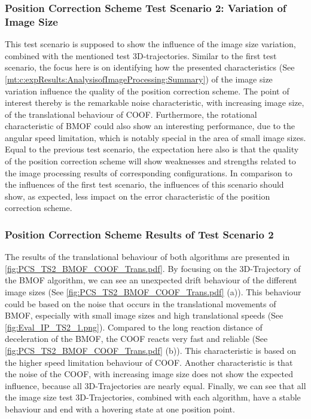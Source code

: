 \subsubsection{Position Correction Scheme Test Scenario 2: Variation of Image Size}
This test scenario is supposed to show the influence of the image size variation, combined with the mentioned test 3D-trajectories. Similar to the first test scenario, the focus here is on identifying how the presented characteristics (See \ref{mt:c:expResults:AnalysisofImageProcessing:Summary}) of the image size variation influence the quality of the position correction scheme. The point of interest thereby is the remarkable noise characteristic, with increasing image size, of the translational behaviour of \gls{COOF}. Furthermore, the rotational characteristic of 
\gls{BMOF} could also show an interesting performance, due to the angular speed limitation, which is notably special in the area of small image sizes. Equal to the previous test scenario, the expectation here also is that the quality of the position correction scheme will show weaknesses and strengths related to the image processing results of corresponding configurations. In comparison to the influences of the first test scenario, the influences of this scenario should show, as expected, less impact on the error characteristic of the position correction scheme.   

\subsubsection{Position Correction Scheme Results of Test Scenario 2}

The results of the translational behaviour of both algorithms are presented in \ref{fig:PCS_TS2_BMOF_COOF_Trans.pdf}. By focusing on the 3D-Trajectory of the \gls{BMOF} algorithm, we can see an unexpected drift behaviour of the different image sizes (See 
\ref{fig:PCS_TS2_BMOF_COOF_Trans.pdf} (a)). This behaviour could be based on the noise that occurs in the translational movements of \gls{BMOF}, especially with small image sizes and high translational speeds (See \ref{fig:Eval_IP_TS2_1.png}). Compared to the long reaction distance of deceleration of the \gls{BMOF}, the \gls{COOF} reacts very fast and reliable (See \ref{fig:PCS_TS2_BMOF_COOF_Trans.pdf} (b)). This characteristic is based on the higher speed limitation behaviour of \gls{COOF}. Another characteristic is that the noise of the \gls{COOF}, with increasing image size does not show the expected influence, because all 3D-Trajectories are nearly equal. Finally, we can see that all the image size test 3D-Trajectories, combined with each algorithm, have a stable behaviour and end with a hovering state at one position point.

